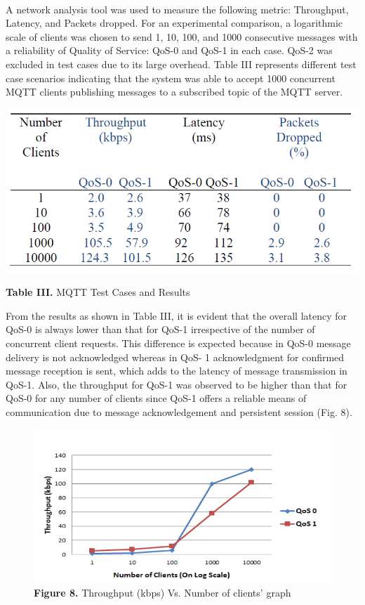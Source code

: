 \documentclass[a4paper,12pt,oneside]{article}
\let\counterwithin\relax
\begin{document}
\paragraph{}
A network analysis tool was used to measure the following
metric: Throughput, Latency, and Packets dropped. For
an experimental comparison, a logarithmic scale of clients was
chosen to send 1, 10, 100, and 1000 consecutive messages
with a reliability of Quality of Service: QoS-0 and QoS-1 in
each case. QoS-2 was excluded in test cases due to its large
overhead. Table III represents different test case scenarios
indicating that the system was able to accept 1000 concurrent
MQTT clients publishing messages to a subscribed topic of
the MQTT server. 
\newline
    \begin{table}[H]
    \includegraphics{Table3.png}
    \centering
    \caption[MQTT Test Cases and Results]{\textbf{Table III.} MQTT Test Cases and Results}
    \end{table}
\newpage
From the results as shown in Table III, it is
evident that the overall latency for QoS-0 is always lower than
that for QoS-1 irrespective of the number of concurrent client
requests. This difference is expected because in
QoS-0 message delivery is not acknowledged whereas in QoS-
1 acknowledgment for confirmed message reception is sent,
which adds to the latency of message transmission in QoS-1.
Also, the throughput for QoS-1 was observed to be higher than
that for QoS-0 for any number of clients since QoS-1 offers a
reliable means of communication due to message
acknowledgement and persistent session (Fig. 8).
    \begin{figure}[H]
    \includegraphics{Figure8.png}
    \centering
    \caption[Throughput (kbps) Vs. Number of clients’ graph]{\textbf{Figure 8.} Throughput (kbps) Vs. Number of clients’ graph}
    \end{figure}
\end{document}
